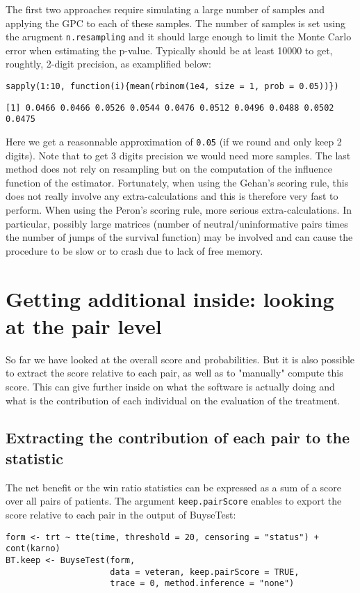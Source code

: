 \documentclass[12pt]{article}
\begin{document}
The first two approaches require simulating a large number of samples
and applying the GPC to each of these samples. The number of samples
is set using the arugment \texttt{n.resampling} and it should large enough to
limit the Monte Carlo error when estimating the p-value. Typically
should be at least 10000 to get, roughtly, 2-digit precision, as
examplified below:
\lstset{language=r,label= ,caption= ,captionpos=b,numbers=none}
\begin{lstlisting}
sapply(1:10, function(i){mean(rbinom(1e4, size = 1, prob = 0.05))})
\end{lstlisting}

\begin{verbatim}
[1] 0.0466 0.0466 0.0526 0.0544 0.0476 0.0512 0.0496 0.0488 0.0502 0.0475
\end{verbatim}
Here we get a reasonnable approximation of \texttt{0.05} (if we round and
only keep 2 digits). Note that to get 3 digits precision we would need
more samples. The last method does not rely on resampling but on the
computation of the influence function of the estimator. Fortunately,
when using the Gehan's scoring rule, this does not really involve any
extra-calculations and this is therefore very fast to perform. When
using the Peron's scoring rule, more serious extra-calculations. In
particular, possibly large matrices (number of neutral/uninformative
pairs times the number of jumps of the survival function) may be
involved and can cause the procedure to be slow or to crash due to
lack of free memory.

\clearpage

\section{Getting additional inside: looking at the pair level}
\label{sec:orge186eec}

So far we have looked at the overall score and probabilities. But it
is also possible to extract the score relative to each pair, as well
as to "manually" compute this score. This can give further inside on
what the software is actually doing and what is the contribution of
each individual on the evaluation of the treatment.

\subsection{Extracting the contribution of each pair to the statistic}
\label{sec:org2a7ab8d}
The net benefit or the win ratio statistics can be expressed as a sum
of a score over all pairs of patients. The argument \texttt{keep.pairScore}
enables to export the score relative to each pair in the output of
BuyseTest:
\lstset{language=r,label= ,caption= ,captionpos=b,numbers=none}
\begin{lstlisting}
form <- trt ~ tte(time, threshold = 20, censoring = "status") + cont(karno)
BT.keep <- BuyseTest(form,
					 data = veteran, keep.pairScore = TRUE, 
					 trace = 0, method.inference = "none")
\end{lstlisting}
\end{document}
